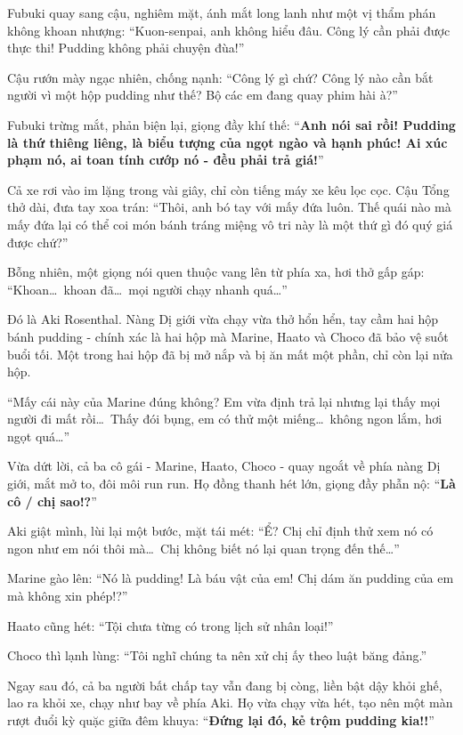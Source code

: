 \documentclass[../main.tex]{subfiles}
\begin{document}
Fubuki quay sang cậu, nghiêm mặt, ánh mắt long lanh như một vị thẩm phán không khoan nhượng: ``Kuon-senpai, anh không hiểu đâu. Công lý cần phải được thực thi! Pudding không phải chuyện đùa!''

Cậu rướn mày ngạc nhiên, chống nạnh: ``Công lý gì chứ? Công lý nào cần bắt người vì một hộp pudding như thế? Bộ các em đang quay phim hài à?''

Fubuki trừng mắt, phản biện lại, giọng đầy khí thế: ``\textbf{Anh nói sai rồi! Pudding là thứ thiêng liêng, là biểu tượng của ngọt ngào và hạnh phúc! Ai xúc phạm nó, ai toan tính cướp nó - đều phải trả giá!}''

Cả xe rơi vào im lặng trong vài giây, chỉ còn tiếng máy xe kêu lọc cọc. Cậu Tổng thở dài, đưa tay xoa trán: ``Thôi, anh bó tay với mấy đứa luôn. Thế quái nào mà mấy đứa lại có thể coi món bánh tráng miệng vô tri này là một thứ gì đó quý giá được chứ?''

Bỗng nhiên, một giọng nói quen thuộc vang lên từ phía xa, hơi thở gấp gáp: ``Khoan\dots\ khoan đã\dots\ mọi người chạy nhanh quá\dots''

Đó là Aki Rosenthal. Nàng Dị giới vừa chạy vừa thở hổn hển, tay cầm hai hộp bánh pudding - chính xác là hai hộp mà Marine, Haato và Choco đã bảo vệ suốt buổi tối. Một trong hai hộp đã bị mở nắp và bị ăn mất một phần, chỉ còn lại nửa hộp.

``Mấy cái này của Marine đúng không? Em vừa định trả lại nhưng lại thấy mọi người đi mất rồi\dots\ Thấy đói bụng, em có thử một miếng\dots\ không ngon lắm, hơi ngọt quá\dots''

Vừa dứt lời, cả ba cô gái - Marine, Haato, Choco - quay ngoắt về phía nàng Dị giới, mắt mở to, đôi môi run run. Họ đồng thanh hét lớn, giọng đầy phẫn nộ: ``\textbf{Là cô / chị sao!?}''

Aki giật mình, lùi lại một bước, mặt tái mét: ``Ể? Chị chỉ định thử xem nó có ngon như em nói thôi mà\dots\ Chị không biết nó lại quan trọng đến thế\dots''

Marine gào lên: ``Nó là pudding! Là báu vật của em! Chị dám ăn pudding của em mà không xin phép!?''

Haato cũng hét: ``Tội chưa từng có trong lịch sử nhân loại!''

Choco thì lạnh lùng: ``Tôi nghĩ chúng ta nên xử chị ấy theo luật băng đảng.''

Ngay sau đó, cả ba người bất chấp tay vẫn đang bị còng, liền bật dậy khỏi ghế, lao ra khỏi xe, chạy như bay về phía Aki. Họ vừa chạy vừa hét, tạo nên một màn rượt đuổi kỳ quặc giữa đêm khuya: ``\textbf{Đứng lại đó, kẻ trộm pudding kia!!}''
\end{document}

